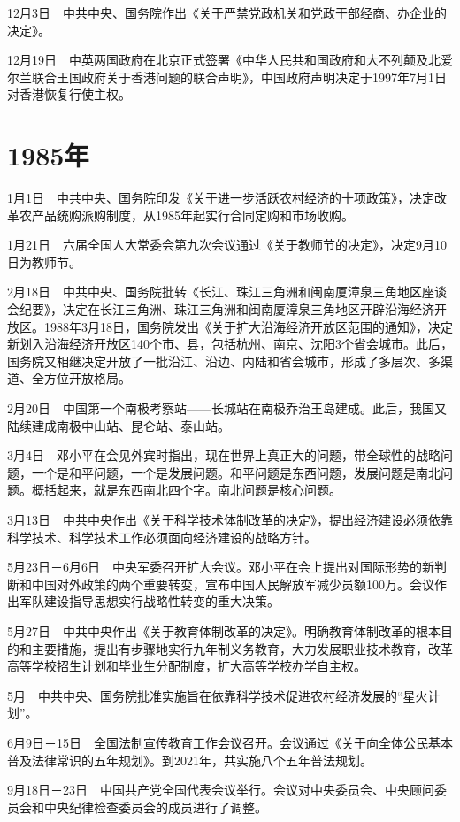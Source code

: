 \documentclass[10pt,a4paper,twocolumn]{book}
\begin{document}
12月3日　中共中央、国务院作出《关于严禁党政机关和党政干部经商、办企业的决定》。

12月19日　中英两国政府在北京正式签署《中华人民共和国政府和大不列颠及北爱尔兰联合王国政府关于香港问题的联合声明》，中国政府声明决定于1997年7月1日对香港恢复行使主权。

\section{1985年}

1月1日　中共中央、国务院印发《关于进一步活跃农村经济的十项政策》，决定改革农产品统购派购制度，从1985年起实行合同定购和市场收购。

1月21日　六届全国人大常委会第九次会议通过《关于教师节的决定》，决定9月10日为教师节。

2月18日　中共中央、国务院批转《长江、珠江三角洲和闽南厦漳泉三角地区座谈会纪要》，决定在长江三角洲、珠江三角洲和闽南厦漳泉三角地区开辟沿海经济开放区。1988年3月18日，国务院发出《关于扩大沿海经济开放区范围的通知》，决定新划入沿海经济开放区140个市、县，包括杭州、南京、沈阳3个省会城市。此后，国务院又相继决定开放了一批沿江、沿边、内陆和省会城市，形成了多层次、多渠道、全方位开放格局。

2月20日　中国第一个南极考察站——长城站在南极乔治王岛建成。此后，我国又陆续建成南极中山站、昆仑站、泰山站。

3月4日　邓小平在会见外宾时指出，现在世界上真正大的问题，带全球性的战略问题，一个是和平问题，一个是发展问题。和平问题是东西问题，发展问题是南北问题。概括起来，就是东西南北四个字。南北问题是核心问题。

3月13日　中共中央作出《关于科学技术体制改革的决定》，提出经济建设必须依靠科学技术、科学技术工作必须面向经济建设的战略方针。

5月23日－6月6日　中央军委召开扩大会议。邓小平在会上提出对国际形势的新判断和中国对外政策的两个重要转变，宣布中国人民解放军减少员额100万。会议作出军队建设指导思想实行战略性转变的重大决策。

5月27日　中共中央作出《关于教育体制改革的决定》。明确教育体制改革的根本目的和主要措施，提出有步骤地实行九年制义务教育，大力发展职业技术教育，改革高等学校招生计划和毕业生分配制度，扩大高等学校办学自主权。

5月　中共中央、国务院批准实施旨在依靠科学技术促进农村经济发展的“星火计划”。

6月9日－15日　全国法制宣传教育工作会议召开。会议通过《关于向全体公民基本普及法律常识的五年规划》。到2021年，共实施八个五年普法规划。

9月18日－23日　中国共产党全国代表会议举行。会议对中央委员会、中央顾问委员会和中央纪律检查委员会的成员进行了调整。
\end{document}
